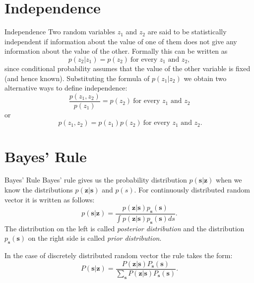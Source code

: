\documentclass{beamer}
\begin{document}
\section{Independence}

\begin{frame}{Independence}
  Two random variables $z_1$ and $z_2$ are said to be statistically independent
  if information about the value of one of them does not give any information
  about the value of the other. Formally this can be written as
  \[
  p(z_2|z_1) = p(z_2) \ \text{for every $z_1$ and $z_2$},
  \]
  since conditional probability assumes that the value of the other variable is
  fixed (and hence known). Substituting the formula of $p(z_1|z_2)$ we obtain
  two alternative ways to define independence:
  \[
  \frac{p(z_1, z_2)}{p(z_1)} = p(z_2)  \ \text{for every $z_1$ and $z_2$}
  \]
  or
  \[
  \ p(z_1, z_2) = p(z_1)p(z_2)  \ \text{for every $z_1$ and $z_2$}.
  \]
\end{frame}

%
%

\section{Bayes' Rule}

\begin{frame}{Bayes' Rule}
  Bayes' rule gives us the probability distribution $p(\mathbf{s}|\mathbf{z})$
  when we know the distributions $p(\mathbf{z}|\mathbf{s})$ and $p(s)$. For
  continuously distributed random vector it is written as follows:
  \[
  p(\mathbf{s}|\mathbf{z}) =
  \frac{p(\mathbf{z}|\mathbf{s})p_{\mathbf{s}}(\mathbf{s})}{\int p(\mathbf{z}|\mathbf{s})p_{\mathbf{s}}(\mathbf{s})ds}.
  \]
  The distribution on the left is called \emph{posterior distribution} and the
  distribution $p_{\mathbf{s}}(\mathbf{s})$ on the right side is called
  \emph{prior distribution}.

  In the case of discretely distributed random vector the rule takes the form:
  \[
  P(\mathbf{s}|\mathbf{z}) =
  \frac{P(\mathbf{z}|\mathbf{s})P_{\mathbf{s}}(\mathbf{s})}{\sum_{\mathbf{s}} P(\mathbf{z}|\mathbf{s})P_{\mathbf{s}}(\mathbf{s})}.
  \]
\end{frame}
\end{document}
